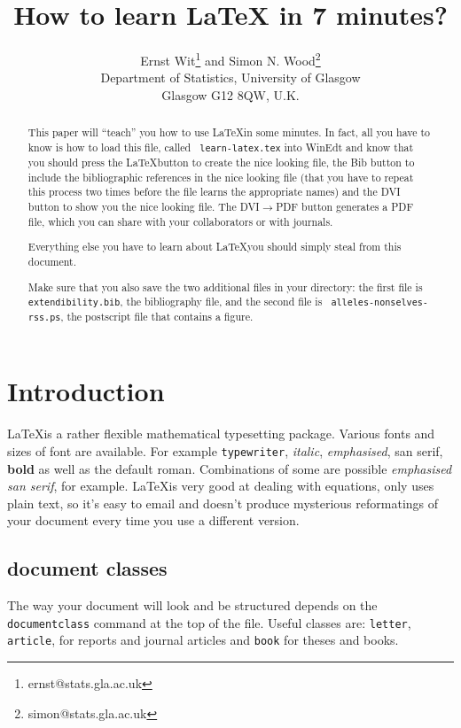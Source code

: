 \documentclass[11pt,a4paper]{article}
\title{How to learn LaTeX in 7 minutes?}
\author{Ernst Wit\thanks{ernst@stats.gla.ac.uk} and Simon N. Wood\thanks{simon@stats.gla.ac.uk}\\ Department of Statistics, University of Glasgow\\ Glasgow G12 8QW, U.K.}
\begin{document}
\maketitle


\begin{abstract}
This paper will ``teach'' you how to use \LaTeX in some minutes. In
fact, all you have to know is how to load this file, called {\tt
learn-latex.tex} into WinEdt and know that you should press the
\LaTeX button to create the nice looking file, the Bib button to
include the bibliographic references in the nice looking file
(that you have to repeat this process two times before the file
learns the appropriate names) and the DVI button to show you the
nice looking file. The DVI$\rightarrow$PDF button generates a PDF
file, which you can share with your collaborators or with
journals.

Everything else you have to learn about \LaTeX you should simply
steal from this document. 

Make sure that you also save the two additional files in your
directory: the first file is {\tt extendibility.bib}, the
bibliography file, and the second file is {\tt
alleles-nonselves-rss.ps}, the postscript file that contains a
figure.
\end{abstract}

\section{Introduction \label{intro}}

\LaTeX is a rather {\tiny f}{\small l}e{\large x}{\Large i}{\huge b}{\Large l}{\large e} mathematical typesetting package. Various fonts and {\large sizes} of font are available. For example {\tt typewriter}, {\it italic}, {\em emphasised}, {\sf san serif}, {\bf bold} as well as the default {\rm roman}. Combinations of some are possible {\sf \em emphasised san serif}, for example. \LaTeX is very good at dealing with equations, only uses plain text, so it's easy to email and doesn't produce mysterious reformatings of your document every time you use a different version.

\subsection{document classes}

The way your document will look and be structured depends on the \\ {\tt documentclass}  command at the top of the file. Useful classes are: {\tt letter}, {\tt article}, for reports and journal articles and {\tt book} for theses and books.
\end{document}
